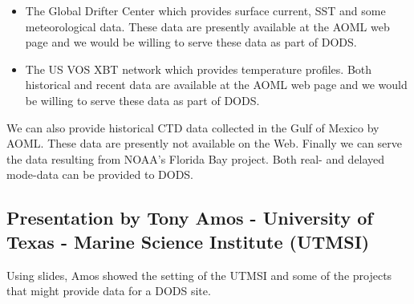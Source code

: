\begin{itemize}

\item     The Global Drifter Center which provides surface current, SST and some meteorological 
data. These data are presently available at the AOML web page and we would be willing to 
serve these data as part of DODS.

\item    The US VOS XBT network which provides temperature profiles. Both historical and recent 
data are available at the AOML web page and we would be willing to serve these data as part 
of DODS.

\end{itemize}

We can also provide historical CTD data collected in the Gulf of
Mexico by AOML. These data are presently not available on the Web.
Finally we can serve the data resulting from NOAA's Florida Bay
project.  Both real- and delayed mode-data can be provided to DODS.

\subsection{Presentation by Tony Amos - University of Texas - Marine Science Institute (UTMSI)}

Using slides, Amos showed the setting of the UTMSI and some of the
projects that might provide data for a DODS site.

